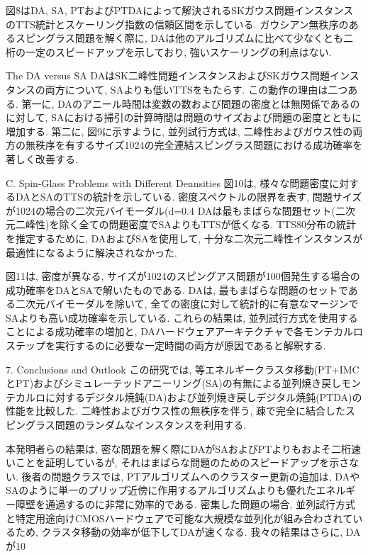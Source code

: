 図8はDA, SA, PTおよびPTDAによって解決されるSKガウス問題インスタンスのTTS統計とスケーリング指数の信頼区間を示している. 
ガウシアン無秩序のあるスピングラス問題を解く際に, DAは他のアルゴリズムに比べて少なくとも二桁の一定のスピードアップを示しており, 強いスケーリングの利点はない. 


The DA versus SA
DAはSK二峰性問題インスタンスおよびSKガウス問題インスタンスの両方について, SAよりも低いTTSをもたらす. 
この動作の理由は二つある. 
第一に, DAのアニール時間は変数の数および問題の密度とは無関係であるのに対して, SAにおける掃引の計算時間は問題のサイズおよび問題の密度とともに増加する. 
第二に, 図9に示すように, 並列試行方式は, 二峰性およびガウス性の両方の無秩序を有するサイズ1024の完全連結スピングラス問題における成功確率を著しく改善する. 

C. Spin-Glass Problems with Different Dennsities
図10は, 様々な問題密度に対するDAとSAのTTSの統計を示している. 
密度スペクトルの限界を表す, 問題サイズが1024の場合の二次元バイモーダル(d=0.4%
DAは最もまばらな問題セット(二次元二峰性)を除く全ての問題密度でSAよりもTTSが低くなる. 
TTS80分布の統計を推定するために, DAおよびSAを使用して, 十分な二次元二峰性インスタンスが最適性になるように解決されなかった.

図11は, 密度が異なる, サイズが1024のスピングアス問題が100個発生する場合の成功確率をDAとSAで解いたものである. 
DAは, 最もまばらな問題のセットである二次元バイモーダルを除いて, 全ての密度に対して統計的に有意なマージンでSAよりも高い成功確率を示している. 
これらの結果は, 並列試行方式を使用することによる成功確率の増加と, DAハードウェアアーキテクチャで各モンテカルロステップを実行するのに必要な一定時間の両方が原因であると解釈する. 

7. Conclusions and Outlook
この研究では, 等エネルギークラスタ移動(PT+IMCとPT)およびシミュレーテッドアニーリング(SA)の有無による並列焼き戻しモンテカルロに対するデジタル焼鈍(DA)および並列焼き戻しデジタル焼鈍(PTDA)の性能を比較した. 
二峰性およびガウス性の無秩序を伴う, 疎で完全に結合したスピングラス問題のランダムなインスタンスを利用する. 

本発明者らの結果は, 密な問題を解く際にDAがSAおよびPTよりもおよそ二桁速いことを証明しているが, それはまばらな問題のためのスピードアップを示さない. 後者の問題クラスでは, PTアルゴリズムへのクラスター更新の追加は, DAやSAのように単一のプリップ近傍に作用するアルゴリズムよりも優れたエネルギー障壁を通過するのに非常に効率的である. 密集した問題の場合, 並列試行方式と特定用途向けCMOSハードウェアで可能な大規模な並列化が組み合わされているため, クラスタ移動の効率が低下してDAが速くなる. 我々の結果はさらに, DAが10%

